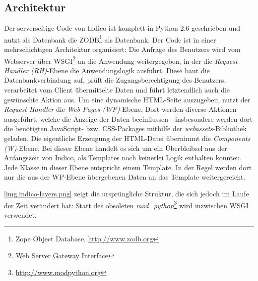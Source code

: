 \subsection{Architektur}
Der serverseitige Code von Indico ist komplett in Python 2.6 geschrieben und nutzt als Datenbank die
ZODB\footnote{Zope Object Database, \href{http://www.zodb.org}{http://www.zodb.org}} als Datenbank.
Der Code ist in einer mehrschichtigen Architektur organisiert: Die Anfrage des Benutzers wird vom
Webserver über WSGI\footnote{\href{http://www.python.org/dev/peps/pep-0333/}{Web Server Gateway
Interface}} an die Anwendung weitergegeben, in der die \emph{Request Handler (RH)}-Ebene die
Anwendungslogik ausführt. Diese baut die Datenbankverbindung auf, prüft die Zugangsberechtigung des
Benutzers, verarbeitet vom Client übermittelte Daten und führt letztendlich auch die gewünschte
Aktion aus. Um eine dynamische HTML-Seite auszugeben, nutzt der \emph{Request Handler} die
\emph{Web Pages (WP)}-Ebene. Dort werden diverse Aktionen ausgeführt, welche die Anzeige der Daten
beeinflussen - insbesondere werden dort die benötigten JavaScript- bzw. CSS-Packages mithilfe der
\emph{webassets}-Bibliothek geladen. Die eigentliche Erzeugung der HTML-Datei übernimmt die
\emph{Components (W)}-Ebene. Bei dieser Ebene handelt es sich um ein Überbleibsel aus der
Anfangszeit von Indico, als Templates noch keinerlei Logik enthalten konnten. Jede Klasse in dieser
Ebene entspricht einem Template. In der Regel werden dort nur die aus der WP-Ebene übergebenen Daten
an das Template weitergereicht.

\autoref{img.indico-layers.png} zeigt die ursprüngliche Struktur, die sich jedoch im Laufe der Zeit
verändert hat: Statt des obsoleten
\emph{mod\_python}\footnote{\href{http://www.modpython.org}{http://www.modpython.org}} wird
inzwischen WSGI verwendet.

